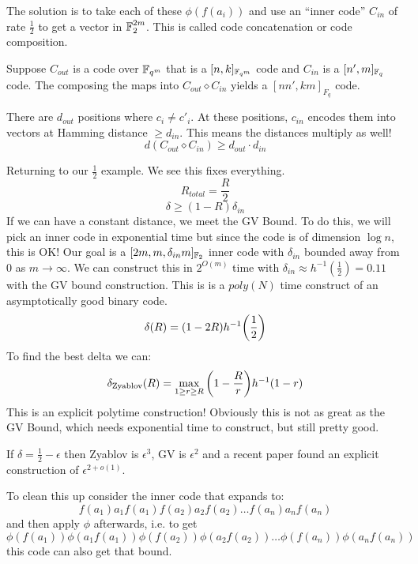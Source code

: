 The solution is to take each of these $\phi(f(a_i))$ and use
an ``inner code'' $C_{in}$ of rate $\frac{1}{2}$ to get a vector in $\operatorname{\mathbb{F}}_2^{2m}$. This is called code concatenation or code composition.

\begin{definition}
    Suppose $C_{out}$ is a code over $\operatorname{\mathbb{F}}_{q^m}$ that is a $[n, k]_{\operatorname{\mathbb{F}}_{q^m}}$ code
    and $C_{in}$ is a $[n', m]_{\operatorname{\mathbb{F}}_q}$ code. The composing the maps into $C_{out} \diamond C_{in}$
    yields a $[nn', km]_{F_q}$ code.
\end{definition}

There are $d_{out}$ positions where $c_i \neq c'_i$. At these positions,
$c_{in}$ encodes them into vectors at Hamming distance $\geq d_{in}$. This means the distances multiply as well!
\[ d(C_{out} \diamond C_{in}) \geq d_{out} \cdot d_{in} \]

Returning to our $\frac{1}{2}$ example. We see this fixes everything.
\[ R_{total} = \frac{R}{2} \]
\[ \delta \geq (1 - R) \delta_{in} \]
If we can have a constant distance, we meet the GV Bound. To do this, we will pick an inner code
in exponential time but since the code is of dimension $\log n$, this is OK! Our goal
is a $[2m, m, \delta_{in} m]_{\operatorname{\mathbb{F}}_2}$ inner code with $\delta_{in}$ bounded away from $0$ as $m \to \infty$.
We can construct this in $2^{O(m)}$ time with $\delta_{in} \approx h^{-1}(\frac{1}{2}) = 0.11$
with the GV bound construction. This is is a $poly(N)$ time construct of an asymptotically good binary code.
\[ \delta(R) = (1 - 2R) h^{-1}\qty(\frac{1}{2}) \]
To find the best delta we can:
\[ \delta_{\text{Zyablov}}(R) = \max_{1 \geq r \geq R} \qty(1 - \frac{R}{r}) h^{-1}(1 - r) \]
This is an explicit polytime construction! Obviously this is not as great as the GV Bound, which needs exponential time to construct,
but still pretty good.

If $\delta = \frac{1}{2} - \epsilon$ then Zyablov is $\epsilon^3$, GV is $\epsilon^2$ and a recent paper found
an explicit construction of $\epsilon^{2 + o(1)}$.

To clean this up consider the inner code that expands to:
\[ f(a_1) a_1 f(a_1) f(a_2) a_2 f(a_2) \dots f(a_n) a_n f(a_n) \]
and then apply $\phi$ afterwards, i.e. to get
\[ \phi(f(a_1)) \phi(a_1 f(a_1)) \phi(f(a_2)) \phi(a_2 f(a_2)) \dots \phi(f(a_n)) \phi(a_n f(a_n)) \]
this code can also get that bound.